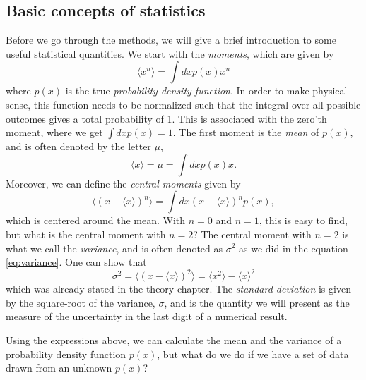 \subsection{Basic concepts of statistics}
Before we go through the methods, we will give a brief introduction to some useful statistical quantities. We start with the \textit{moments}, which are given by
\begin{equation*}
\langle x^n\rangle=\int dxp(x)x^n
\end{equation*}
where $p(x)$ is the true \textit{probability density function}. In order to make physical sense, this function needs to be normalized such that the integral over all possible outcomes gives a total probability of 1. This is associated with the zero'th moment, where we get $\int dxp(x)=1$. The first moment is the \textit{mean} of $p(x)$, and is often denoted by the letter $\mu$,
\begin{equation}
\langle x\rangle=\mu=\int dxp(x)x.
\end{equation}
Moreover, we can define the \textit{central moments} given by
\begin{equation}
\langle(x-\langle x\rangle)^n\rangle=\int dx(x-\langle x\rangle)^np(x),
\end{equation}
which is centered around the mean. With $n=0$ and $n=1$, this is easy to find, but what is the central moment with $n=2$? The central moment with $n=2$ is what we call the \textit{variance}, and is often denoted as $\sigma^2$ as we did in the equation \eqref{eq:variance}. One can show that
\begin{equation}
\sigma^2=\langle(x-\langle x\rangle)^2\rangle=\langle x^2\rangle - \langle x \rangle^2
\label{eq:variance2}
\end{equation}
which was already stated in the theory chapter. The \textit{standard deviation} is given by the square-root of the variance, $\sigma$, and is the quantity we will present as the measure of the uncertainty in the last digit of a numerical result. 

Using the expressions above, we can calculate the mean and the variance of a probability density function $p(x)$, but what do we do if we have a set of data drawn from an unknown $p(x)$?

